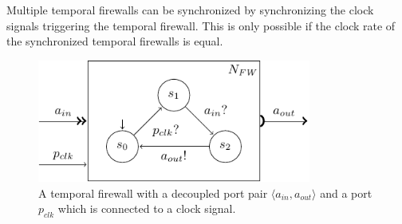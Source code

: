 Multiple temporal firewalls can be synchronized by synchronizing the clock signals triggering the temporal firewall.
This is only possible if the clock rate of the synchronized temporal firewalls is equal.

\begin{figure}[bht]\begin{center}
\TopFigSpace
    \centering
    \includegraphics[width=9cm]{fig/sia_firewall_dec.pdf}
    \CaptionFigSpace
    \caption{A temporal firewall with a decoupled port pair $\langle a_{in}, a_{out} \rangle$ and a port $p_{clk}$ which is connected to a clock signal.}
    \label{fig_tcm_tfw}
\BotFigSpace
\end{center}\end{figure}

